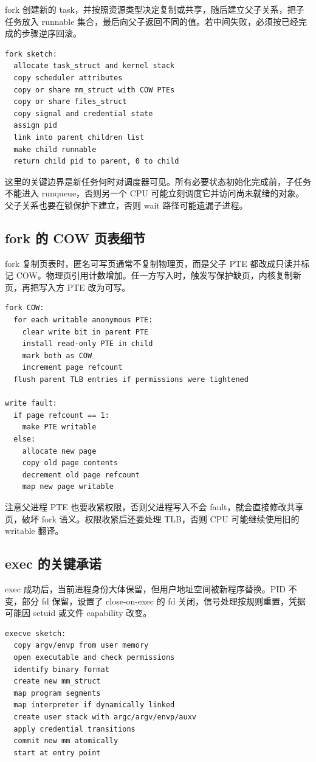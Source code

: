fork 创建新的 task，并按照资源类型决定复制或共享，随后建立父子关系，把子任务放入 runnable 集合，最后向父子返回不同的值。若中间失败，必须按已经完成的步骤逆序回滚。

\begin{lstlisting}
fork sketch:
  allocate task_struct and kernel stack
  copy scheduler attributes
  copy or share mm_struct with COW PTEs
  copy or share files_struct
  copy signal and credential state
  assign pid
  link into parent children list
  make child runnable
  return child pid to parent, 0 to child
\end{lstlisting}

这里的关键边界是新任务何时对调度器可见。所有必要状态初始化完成前，子任务不能进入 runqueue，否则另一个 CPU 可能立刻调度它并访问尚未就绪的对象。父子关系也要在锁保护下建立，否则 wait 路径可能遗漏子进程。

\subsection{fork 的 COW 页表细节}

fork 复制页表时，匿名可写页通常不复制物理页，而是父子 PTE 都改成只读并标记 COW。物理页引用计数增加。任一方写入时，触发写保护缺页，内核复制新页，再把写入方 PTE 改为可写。

\begin{lstlisting}
fork COW:
  for each writable anonymous PTE:
    clear write bit in parent PTE
    install read-only PTE in child
    mark both as COW
    increment page refcount
  flush parent TLB entries if permissions were tightened

write fault:
  if page refcount == 1:
    make PTE writable
  else:
    allocate new page
    copy old page contents
    decrement old page refcount
    map new page writable
\end{lstlisting}

注意父进程 PTE 也要收紧权限，否则父进程写入不会 fault，就会直接修改共享页，破坏 fork 语义。权限收紧后还要处理 TLB，否则 CPU 可能继续使用旧的 writable 翻译。

\subsection{exec 的关键承诺}

exec 成功后，当前进程身份大体保留，但用户地址空间被新程序替换。PID 不变，部分 fd 保留，设置了 close-on-exec 的 fd 关闭，信号处理按规则重置，凭据可能因 setuid 或文件 capability 改变。

\begin{lstlisting}
execve sketch:
  copy argv/envp from user memory
  open executable and check permissions
  identify binary format
  create new mm_struct
  map program segments
  map interpreter if dynamically linked
  create user stack with argc/argv/envp/auxv
  apply credential transitions
  commit new mm atomically
  start at entry point
\end{lstlisting}

